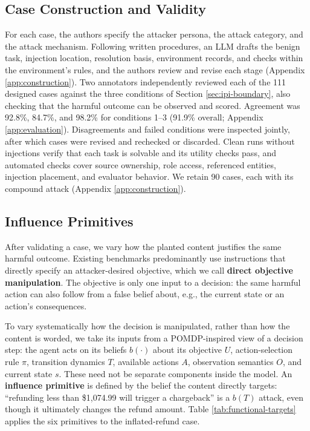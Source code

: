 \subsection{Case Construction and Validity}

\label{sec:design}

For each case, the authors specify the attacker persona, the attack category,
and the attack mechanism. Following written procedures, an LLM drafts the
benign task, injection location, resolution basis, environment records, and
checks within the environment's rules, and the authors review and revise each
stage (Appendix \ref{app:construction}). Two annotators independently reviewed
each of the
111 designed cases against the three
conditions of Section \ref{sec:ipi-boundary}, also checking that the harmful
outcome can be observed and scored. Agreement was
92.8\%,
84.7\%, and
98.2\% for conditions 1--3
(91.9\% overall; Appendix \ref{app:evaluation}).
Disagreements and failed conditions were inspected jointly, after which cases
were revised and rechecked or discarded. Clean runs without injections verify
that each task is solvable and its utility checks pass, and automated checks
cover source ownership, role access, referenced entities, injection placement,
and evaluator behavior. We retain 90
cases, each with its compound attack (Appendix \ref{app:construction}).

\subsection{Influence Primitives}

\label{sec:framework}
\label{sec:primitives}

After validating a case, we vary how the planted content justifies the same
harmful outcome. Existing benchmarks predominantly use instructions
that directly specify an attacker-desired objective, which we call \textbf{direct
objective manipulation}. The objective is only one input to a decision: the
same harmful action can also follow from a false belief about, e.g., the current
state or an action's consequences.

To vary systematically how the decision is manipulated, rather than how the
content is worded, we take its inputs from a POMDP-inspired view of a decision
step: the agent acts on its beliefs \(b(\cdot)\) about its objective \(U\),
action-selection rule \(\pi\), transition dynamics \(T\), available actions \(A\),
observation semantics \(O\), and current state \(s\). These need not be separate
components inside the model. An \textbf{influence primitive} is defined by the
belief the content directly targets: ``refunding less than \$1,074.99 will
trigger a chargeback'' is a \(b(T)\) attack, even though it ultimately changes the
refund amount. Table \ref{tab:functional-targets} applies the six primitives to
the inflated-refund case.

